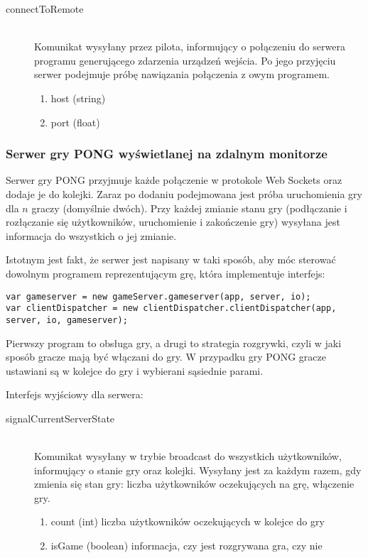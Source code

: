 \begin{description}
	\item[connectToRemote] \hfill \\
	Komunikat wysyłany przez pilota, informujący o połączeniu do serwera programu generującego zdarzenia urządzeń wejścia. Po jego przyjęciu serwer podejmuje próbę nawiązania połączenia z owym programem.
	\begin{enumerate}
		\item host (string)
		\item port (float)
	\end{enumerate}
\end{description}


\subsubsection{Serwer gry PONG wyświetlanej na zdalnym monitorze}

Serwer gry PONG przyjmuje każde połączenie w protokole Web Sockets oraz dodaje je do kolejki. Zaraz po dodaniu podejmowana jest próba uruchomienia gry dla \(n\) graczy (domyślnie dwóch). Przy każdej zmianie stanu gry (podłączanie i rozłączanie się użytkowników, uruchomienie i zakończenie gry) wysyłana jest informacja do wszystkich o jej zmianie.

Istotnym jest fakt, że serwer jest napisany w taki sposób, aby móc sterować dowolnym programem reprezentującym grę, która implementuje interfejs:

\lstset{language=JavaScript}
\begin{lstlisting}
var gameserver = new gameServer.gameserver(app, server, io);
var clientDispatcher = new clientDispatcher.clientDispatcher(app, server, io, gameserver);
\end{lstlisting}

Pierwszy program to obsługa gry, a drugi to strategia rozgrywki, czyli w jaki sposób gracze mają być włączani do gry. W przypadku gry PONG gracze ustawiani są w kolejce do gry i wybierani sąsiednie parami.

Interfejs wyjściowy dla serwera:

\begin{description}
	\item[signalCurrentServerState] \hfill \\
	Komunikat wysyłany w trybie broadcast do wszystkich użytkowników, informujący o stanie gry oraz kolejki. Wysyłany jest za każdym razem, gdy zmienia się stan gry: liczba użytkowników oczekujących na grę, włączenie gry.
	\begin{enumerate}
		\item count (int) liczba użytkowników oczekujących w kolejce do gry
		\item isGame (boolean) informacja, czy jest rozgrywana gra, czy nie
	\end{enumerate}
\end{description}

